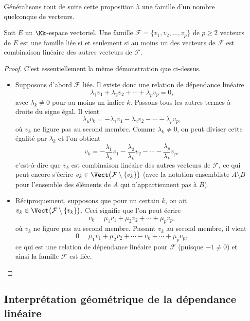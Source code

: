 \documentclass[class=report,crop=false]{standalone}
\begin{document}
Généralisons tout de suite cette proposition à une famille
d'un nombre quelconque de vecteurs.
\begin{theoreme}
\label{carac liee}
Soit $E$ un $\Kk$-espace vectoriel.
Une famille $\mathcal{F}=\{v_1, v_2,\ldots, v_p\}$ de $p\ge 2$
vecteurs de $E$ est une famille liée si et seulement si
au moins un des vecteurs de $\mathcal{F}$ est combinaison linéaire
des autres vecteurs de $\mathcal{F}$.
\end{theoreme}



\begin{proof}
C'est essentiellement la même démonstration que ci-dessus.
\begin{itemize}
  \item Supposons d'abord $\mathcal{F}$ liée.
  Il existe donc une relation de dépendance linéaire
$$\lambda_1 v_1+\lambda_2 v_2+\cdots+\lambda_p v_p=0,$$
avec $\lambda_k\neq 0$ pour au moins un indice $k$.
Passons tous les autres termes à droite du signe égal. Il vient
$$\lambda_k v_k=-\lambda_1 v_1-\lambda_2 v_2-\cdots-\lambda_p v_p,$$
où $ v_k$ ne figure pas au second membre. Comme $\lambda_k\neq 0$, on peut diviser cette égalité par $\lambda_k$ et l'on obtient
$$ v_k=-\frac{\lambda_1}{\lambda_k} v_1-\frac{\lambda_2}{\lambda_k} v_2-\cdots-\frac{\lambda_p}{\lambda_k} v_p,$$
c'est-à-dire que $v_k$ est combinaison linéaire des autres
vecteurs de $\mathcal{F}$, ce qui peut encore s'écrire
$ v_k \in \Vect \big( \mathcal{F}\setminus\{v_k\} \big)$
(avec la notation ensembliste $A\setminus B$ pour l'ensemble des éléments
de $A$ qui n'appartiennent pas à $B$).

  \item Réciproquement, supposons que pour un certain $k$, on ait
$ v_k \in \Vect \big(\mathcal{F}\setminus\{v_k\}\big)$.
Ceci signifie que l'on peut écrire
$$ v_k=\mu_1 v_1+\mu_2 v_2+\cdots+\mu_p v_p,$$
où $v_k$ ne figure pas au second membre.
Passant $v_k$ au second membre, il vient
$$ 0=\mu_1 v_1+\mu_2 v_2+\cdots- v_k+\cdots+\mu_p v_p,$$
ce qui est une relation de dépendance linéaire
pour $\mathcal{F}$ (puisque $-1\neq 0$) et ainsi
la famille $\mathcal{F}$ est liée.

\end{itemize}


\end{proof}



\subsection{Interprétation géométrique de la dépendance linéaire}
\end{document}
